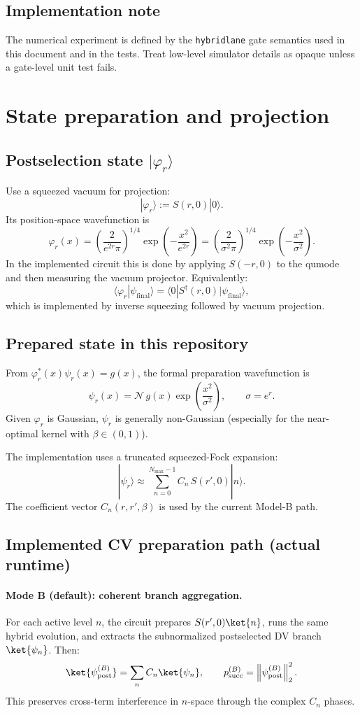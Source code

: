 \documentclass[11pt]{article}
\newcommand{\norm}[1]{\left\lVert #1 \right\rVert}
\begin{document}
\subsection{Implementation note}
The numerical experiment is defined by the \texttt{hybridlane} gate semantics used in this document and in the tests.
Treat low-level simulator details as opaque unless a gate-level unit test fails.

\section{State preparation and projection}
\label{sec:stateprep}

\subsection{Postselection state $|\varphi_r\rangle$}
Use a squeezed vacuum for projection:
\[
|\varphi_r\rangle := S(r,0)|0\rangle.
\]
Its position-space wavefunction is
\[
\varphi_r(x)=\left(\frac{2}{e^{2r}\pi}\right)^{1/4}\exp\!\left(-\frac{x^2}{e^{2r}}\right)
=\left(\frac{2}{\sigma^2\pi}\right)^{1/4}\exp\!\left(-\frac{x^2}{\sigma^2}\right).
\]
In the implemented circuit this is done by applying \(S(-r,0)\) to the qumode and then measuring the vacuum projector.
Equivalently:
\[
\langle \varphi_r|\psi_{\mathrm{final}}\rangle
=
\langle 0|S^\dagger(r,0)|\psi_{\mathrm{final}}\rangle,
\]
which is implemented by inverse squeezing followed by vacuum projection.

\subsection{Prepared state in this repository}
From \(\varphi_r^*(x)\psi_r(x)=g(x)\), the formal preparation wavefunction is
\[
\psi_r(x)=\mathcal N\,g(x)\exp\!\left(\frac{x^2}{\sigma^2}\right),\qquad \sigma=e^r.
\]
Given \(\varphi_r\) is Gaussian, \(\psi_r\) is generally non-Gaussian (especially for the near-optimal kernel with \(\beta\in(0,1)\)).

The implementation uses a truncated squeezed-Fock expansion:
\[
|\psi_r\rangle\approx\sum_{n=0}^{N_{\max}-1} C_n\,S(r',0)|n\rangle.
\]
The coefficient vector \(C_n(r,r',\beta)\) is used by the current Model-B path.

\subsection{Implemented CV preparation path (actual runtime)}
\paragraph{Mode B (default): coherent branch aggregation.}
For each active level \(n\), the circuit prepares \(S(r',0)\ket{n}\), runs the same hybrid evolution,
and extracts the subnormalized postselected DV branch \(\ket{\psi_n}\).
Then:
\[
\ket{\psi_{\mathrm{post}}^{(B)}}=\sum_n C_n\ket{\psi_n},\qquad
p_{\mathrm{succ}}^{(B)}=\norm{\psi_{\mathrm{post}}^{(B)}}_2^2.
\]
This preserves cross-term interference in \(n\)-space through the complex \(C_n\) phases.
\end{document}
